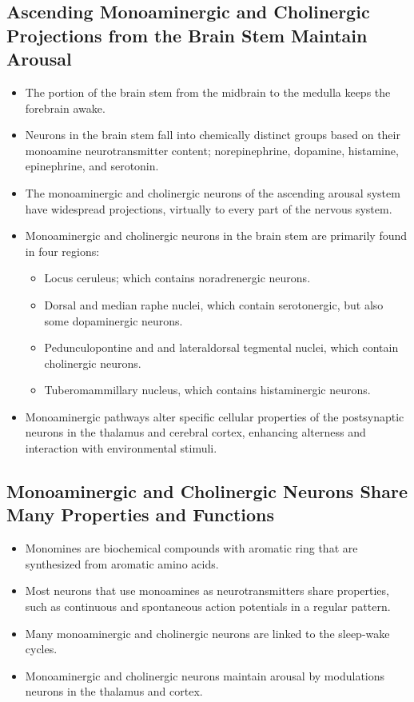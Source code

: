 \documentclass[12pt,a4paper]{article}
\begin{document}
\subsection{Ascending Monoaminergic and Cholinergic Projections from the Brain Stem Maintain Arousal}
\begin{itemize}
    \item The portion of the brain stem from the midbrain to the medulla keeps the forebrain awake.
    \item Neurons in the brain stem fall into chemically distinct groups based on their monoamine neurotransmitter content; norepinephrine, dopamine, histamine, epinephrine, and serotonin.
    \item The monoaminergic and cholinergic neurons of the ascending arousal system have widespread projections, virtually to every part of the nervous system.
    \item Monoaminergic and cholinergic neurons in the brain stem are primarily found in four regions:
        \begin{itemize}
            \item Locus ceruleus; which contains noradrenergic neurons.
            \item Dorsal and median raphe nuclei, which contain serotonergic, but also some dopaminergic neurons.
            \item Pedunculopontine and and lateraldorsal tegmental nuclei, which contain cholinergic neurons.
            \item Tuberomammillary nucleus, which contains histaminergic neurons. 
        \end{itemize}
    \item Monoaminergic pathways alter specific cellular properties of the postsynaptic neurons in the thalamus and cerebral cortex, enhancing alterness and interaction with environmental stimuli.
\end{itemize}

\subsection{Monoaminergic and Cholinergic Neurons Share Many Properties and Functions}
\begin{itemize}
    \item Monomines are biochemical compounds with aromatic ring that are synthesized from aromatic amino acids.
    \item Most neurons that use monoamines as neurotransmitters share properties, such as continuous and spontaneous action potentials in a regular pattern.
    \item Many monoaminergic and cholinergic neurons are linked to the sleep-wake cycles.
    \item Monoaminergic and cholinergic neurons maintain arousal by modulations neurons in the thalamus and cortex.
\end{itemize}
\end{document}
